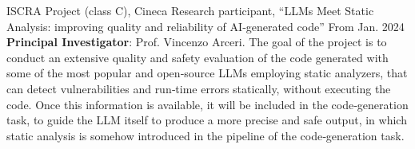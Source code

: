 

\begin{cventries}
	\cventry
	{ISCRA Project (class C), Cineca}
	{Research participant, \textquotedblleft{LLMs Meet Static Analysis: improving quality and reliability of AI‑generated code}\textquotedblright}
	{}
	{From Jan. 2024}
	{ \textbf{Principal Investigator}: Prof. Vincenzo Arceri. The goal of the project is to conduct an extensive quality and safety evaluation of the code generated with some of the most popular and open‑source LLMs employing static analyzers, that can detect vulnerabilities and run‑time errors statically, without executing the code. Once this information is available, it will be included in the code‑generation task, to guide the LLM itself to produce a more precise and safe output, in which static analysis is somehow introduced in the pipeline of the code‑generation task. }

\end{cventries}
